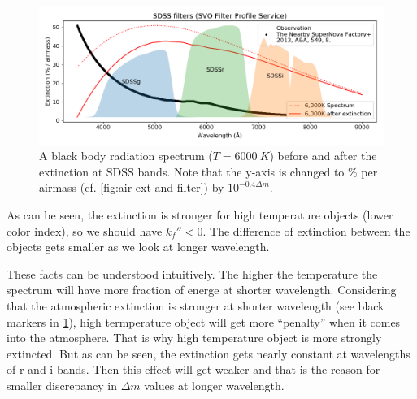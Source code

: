 \begin{figure}[ht!]
\centering
\includegraphics[width=0.9\linewidth]{figs/air-ext-bbrad}
\caption{A black body radiation spectrum ($ T = \SI{6000}{K} $) before and after the extinction at SDSS bands. Note that the y-axis is changed to \% per airmass (cf. \cref{fig:air-ext-and-filter}) by $ 10^{-0.4 \Delta m} $.}
\label{fig:air-ext-bbrad}
\end{figure}

As can be seen, the extinction is stronger for high temperature objects (lower color index), so we should have $ k_f'' < 0 $. The difference of extinction between the objects gets smaller as we look at longer wavelength.

These facts can be understood intuitively. The higher the temperature the spectrum will have more fraction of energe at shorter wavelength. Considering that the atmospheric extinction is stronger at shorter wavelength (see black markers in \cref{fig:air-ext-bbrad}), high termperature object will get more ``penalty'' when it comes into the atmosphere. That is why high temperature object is more strongly extincted. But as can be seen, the extinction gets nearly constant at wavelengths of r and i bands. Then this effect will get weaker and that is the reason for smaller discrepancy in $ \Delta m $ values at longer wavelength.




